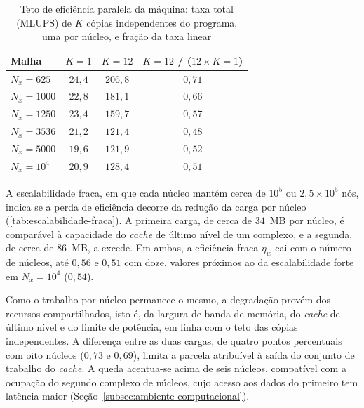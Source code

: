 \begin{table}[H]
    \centering
    \caption{Teto de eficiência paralela da máquina: taxa total (MLUPS) de $K$ cópias independentes do programa, uma por núcleo, e fração da taxa linear}
    \label{tab:teto-copias}
    \begin{tabular}{lccc}
        \toprule
        Malha & $K=1$ & $K=12$ & $K=12$ / ($12 \times K=1$) \\
        \midrule
        $N_x = 625$ & $24{,}4$ & $206{,}8$ & $0{,}71$ \\
        $N_x = 1000$ & $22{,}8$ & $181{,}1$ & $0{,}66$ \\
        $N_x = 1250$ & $23{,}4$ & $159{,}7$ & $0{,}57$ \\
        $N_x = 3536$ & $21{,}2$ & $121{,}4$ & $0{,}48$ \\
        $N_x = 5000$ & $19{,}6$ & $121{,}9$ & $0{,}52$ \\
        $N_x = 10^4$ & $20{,}9$ & $128{,}4$ & $0{,}51$ \\
        \bottomrule
    \end{tabular}
\end{table}

A escalabilidade fraca, em que cada núcleo mantém cerca de \(10^5\) ou \(2{,}5\times10^5\) nós, indica se a perda de eficiência decorre da redução da carga por núcleo (\autoref{tab:escalabilidade-fraca}).
A primeira carga, de cerca de \(34\)~MB por núcleo, é comparável à capacidade do \textit{cache} de último nível de um complexo, e a segunda, de cerca de \(86\)~MB, a excede.
Em ambas, a eficiência fraca \(\eta_w\) cai com o número de núcleos, até \(0{,}56\) e \(0{,}51\) com doze, valores próximos ao da escalabilidade forte em \(N_x = 10^4\) (\(0{,}54\)).

Como o trabalho por núcleo permanece o mesmo, a degradação provém dos recursos compartilhados, isto é, da largura de banda de memória, do \textit{cache} de último nível e do limite de potência, em linha com o teto das cópias independentes.
A diferença entre as duas cargas, de quatro pontos percentuais com oito núcleos (\(0{,}73\) e \(0{,}69\)), limita a parcela atribuível à saída do conjunto de trabalho do \textit{cache}.
A queda acentua-se acima de seis núcleos, compatível com a ocupação do segundo complexo de núcleos, cujo acesso aos dados do primeiro tem latência maior (Seção~\ref{subsec:ambiente-computacional}).

